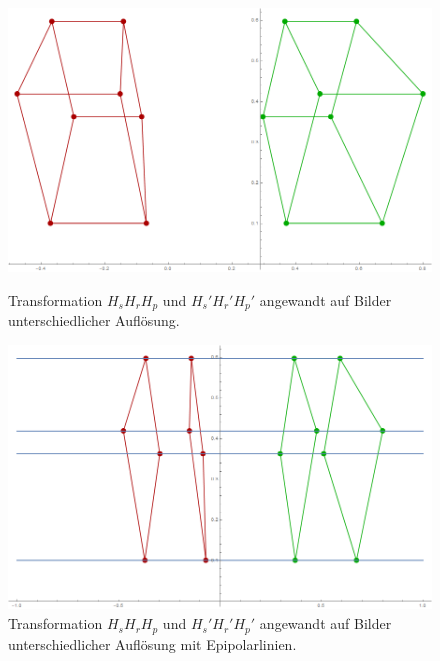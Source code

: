 

\begin{figure}[!htb]
	\includegraphics[width=\linewidth]{images/Rectification_HsHrHp_different_Solutions.png}
	\caption[Transformation $H_sH_rH_p$ und $H_s'H_r'H_p'$ bei unterschiedlicher Auflösung]{Transformation $H_sH_rH_p$ und $H_s'H_r'H_p'$ angewandt auf Bilder unterschiedlicher Auflösung.}
	\label{fig:AbbRecDifResHsHrHp}
	\endminipage\hfill
			\includegraphics[width=\linewidth]{images/Rectification_four_different_Solutions.png}
	\caption[Transformation $H_sH_rH_p$ und $H_s'H_r'H_p'$ mit Epipolarlinien]{Transformation $H_sH_rH_p$ und $H_s'H_r'H_p'$ angewandt auf Bilder unterschiedlicher Auflösung mit Epipolarlinien.}
	\label{fig:AbbRecDifResHsHrHpLines}
	\endminipage\hfill
\end{figure}
\pagebreak



